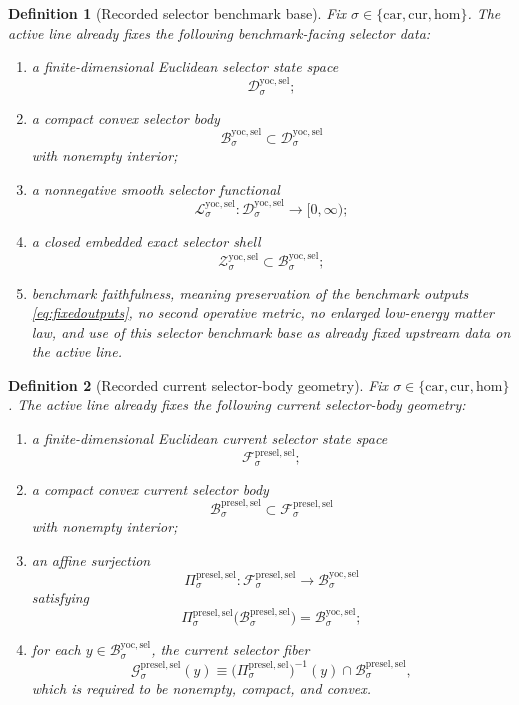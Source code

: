 \documentclass[11pt]{article}
\newcommand{\Car}{\mathrm{car}}
\newcommand{\Cur}{\mathrm{cur}}
\newcommand{\Hom}{\mathrm{hom}}
\newcommand{\YoctoSelectorSpace}[1]{\mathcal D_{#1}^{\mathrm{yoc,sel}}}
\newcommand{\YoctoSelectorBody}[1]{\mathcal B_{#1}^{\mathrm{yoc,sel}}}
\newcommand{\YoctoSelectorFunctional}[1]{\mathscr L_{#1}^{\mathrm{yoc,sel}}}
\newcommand{\YoctoSelectorShell}[1]{\mathcal Z_{#1}^{\mathrm{yoc,sel}}}
\newcommand{\PreSectionSelectorSpace}[1]{\mathcal F_{#1}^{\mathrm{presel,sel}}}
\newcommand{\PreSectionSelectorBody}[1]{\mathcal B_{#1}^{\mathrm{presel,sel}}}
\newcommand{\PreSectionSelectorProj}[1]{\Pi_{#1}^{\mathrm{presel,sel}}}
\newcommand{\PreSectionSelectorFiber}[2]{\mathcal G_{#1}^{\mathrm{presel,sel}}(#2)}
\newtheorem{definition}{Definition}
\begin{document}
\begin{definition}[Recorded selector benchmark base]
\label{def:selectorbase}
Fix \(\sigma\in\{\Car,\Cur,\Hom\}\). The active line already fixes the following benchmark-facing selector data:
\begin{enumerate}
    \item a finite-dimensional Euclidean selector state space
    \[
    \YoctoSelectorSpace{\sigma};
    \]
    \item a compact convex selector body
    \[
    \YoctoSelectorBody{\sigma}\subset\YoctoSelectorSpace{\sigma}
    \]
    with nonempty interior;
    \item a nonnegative smooth selector functional
    \[
    \YoctoSelectorFunctional{\sigma}:\YoctoSelectorSpace{\sigma}\to[0,\infty);
    \]
    \item a closed embedded exact selector shell
    \[
    \YoctoSelectorShell{\sigma}\subset\YoctoSelectorBody{\sigma};
    \]
    \item benchmark faithfulness, meaning preservation of the benchmark outputs \eqref{eq:fixedoutputs}, no second operative metric, no enlarged low-energy matter law, and use of this selector benchmark base as already fixed upstream data on the active line.
\end{enumerate}
\end{definition}

\begin{definition}[Recorded current selector-body geometry]
\label{def:selectorgeometry}
Fix \(\sigma\in\{\Car,\Cur,\Hom\}\). The active line already fixes the following current selector-body geometry:
\begin{enumerate}
    \item a finite-dimensional Euclidean current selector state space
    \[
    \PreSectionSelectorSpace{\sigma};
    \]
    \item a compact convex current selector body
    \[
    \PreSectionSelectorBody{\sigma}\subset\PreSectionSelectorSpace{\sigma}
    \]
    with nonempty interior;
    \item an affine surjection
    \[
    \PreSectionSelectorProj{\sigma}:\PreSectionSelectorSpace{\sigma}\to\YoctoSelectorBody{\sigma}
    \]
    satisfying
    \[
    \PreSectionSelectorProj{\sigma}\bigl(\PreSectionSelectorBody{\sigma}\bigr)=\YoctoSelectorBody{\sigma};
    \]
    \item for each \(y\in\YoctoSelectorBody{\sigma}\), the current selector fiber
    \[
    \PreSectionSelectorFiber{\sigma}{y}
    \equiv
    \bigl(\PreSectionSelectorProj{\sigma}\bigr)^{-1}(y)\cap\PreSectionSelectorBody{\sigma},
    \]
    which is required to be nonempty, compact, and convex.
\end{enumerate}
\end{definition}
\end{document}
